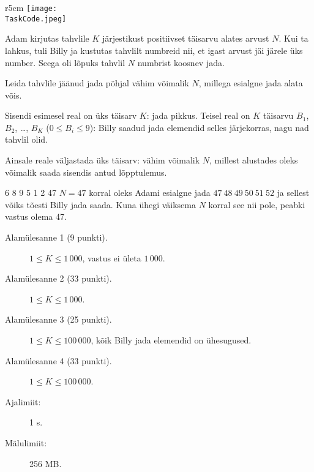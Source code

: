 \documentclass{boi2014-et}
\renewcommand{\TaskCode}{sequence}
\begin{document}
    \begin{wrapfigure}[5]{r}{5cm}
        \vspace{-24pt}
        \texttt{[image: \\TaskCode.jpeg]}
    \end{wrapfigure}

    Adam kirjutas tahvlile $K$ järjestikust positiivset täisarvu alates arvust $N$.
    Kui ta lahkus, tuli Billy ja kustutas tahvlilt numbreid nii, et igast arvust jäi järele üks number.
    Seega oli lõpuks tahvlil $N$ numbrist koosnev jada.

    \Task

    Leida tahvlile jäänud jada põhjal vähim võimalik $N$, millega esialgne jada alata võis.

    \Input

    Sisendi esimesel real on üks täisarv $K$: jada pikkus.
    Teisel real on $K$ täisarvu $B_1$, $B_2$, \dots, $B_K$ ($0 \le B_i \le 9$):
    Billy saadud jada elemendid selles järjekorras, nagu nad tahvlil olid.

    \Output

    Ainsale reale väljastada üks täisarv: vähim võimalik $N$, millest alustades
    oleks võimalik saada sisendis antud lõpptulemus.

    \Example

    \example
    {
        6 8 9 5 1 2
    }
    {
        47
    }
    {
        $N = 47$ korral oleks Adami esialgne jada $47\ 48\ 49\ 50\ 51\ 52$
        ja sellest võiks tõesti Billy jada saada. Kuna ühegi väiksema
        $N$ korral see nii pole, peabki vastus olema 47.
    }

    \Scoring

    \begin{description}
        \item[Alamülesanne 1 (9 punkti).] $1 \le K \le 1\,000$,
            vastus ei ületa $1\,000$.
        \item[Alamülesanne 2 (33 punkti).] $1 \le K \le 1\,000$.
        \item[Alamülesanne 3 (25 punkti).] $1 \le K \le 100\,000$,
            kõik Billy jada elemendid on ühesugused.
        \item[Alamülesanne 4 (33 punkti).] $1 \le K \le 100\,000$.
    \end{description}

    \Constraints

    \begin{description}
        \item[Ajalimiit:] 1 s.
        \item[Mälulimiit:] 256 MB.
    \end{description}
\end{document}
